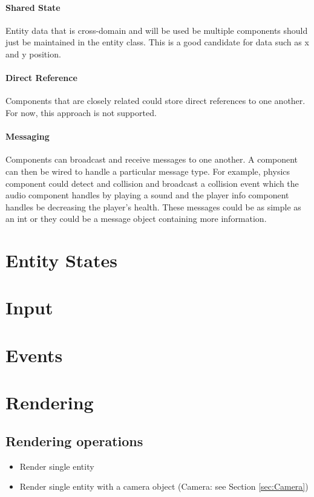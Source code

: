 \documentclass[12pt]{article}
\begin{document}
\paragraph{ Shared State}
Entity data that is cross-domain and will be used be multiple components should just be maintained in the entity class.  This is a good candidate for data such as x and y position.
\paragraph{ Direct Reference }
Components that are closely related could store direct references to one another.  For now, this approach is not supported.
\paragraph{ Messaging }
Components can broadcast and receive messages to one another.  A component can then be wired to handle a particular message type.  For example, physics component could detect and collision and broadcast a collision event which the audio component handles by playing a sound and the player info component handles be decreasing the player's health.  These messages could be as simple as an int or they could be a message object containing more information.

\section{	Entity States }

\section{	Input }

\section{	Events }

\section{	Rendering }
\subsection{Rendering operations }
\begin{itemize}
	\item Render single entity
	\item Render single entity with a camera object (Camera: see Section \ref{sec:Camera})
\end{itemize}
\end{document}

